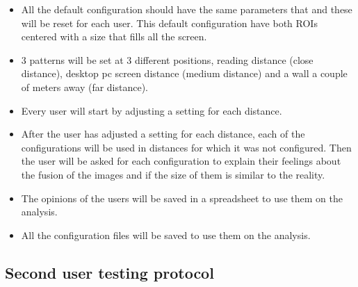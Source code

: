 \documentclass[10pt,a4paper,twocolumn,twoside]{article}
\begin{document}
	\begin{itemize}
		\item All the default configuration should have the same parameters that and these will be reset for each user. This default configuration have both ROIs centered with a size that fills all the screen. 
		
		\item 3 patterns will be set at 3 different positions, reading distance (close distance), desktop pc screen distance (medium distance) and a wall a couple of meters away (far distance).
		
		\item Every user will start by adjusting a setting for each distance. 
		
		\item After the user has adjusted a setting for each distance, each of the configurations will be used in distances for which it was not configured. Then the user will be asked for each configuration to explain their feelings about the fusion of the images and if the size of them is similar to the reality.  
		
		\item The opinions of the users will be saved in a spreadsheet to use them on the analysis. 
		
		\item All the configuration files will be saved to use them on the analysis. 
	\end{itemize}
	
	
	 
	\subsection{Second user testing protocol}
	\label{sec:annex:user2}
	
\end{document}
